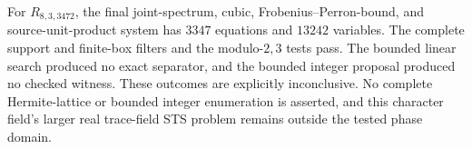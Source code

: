For $R_{8,3,3472}$, the final joint-spectrum, cubic, Frobenius--Perron-bound,
and source-unit-product system has $3347$ equations and $13242$ variables.
The complete support and finite-box filters and the modulo-$2,3$ tests
pass.  The bounded linear search produced no exact separator, and the
bounded integer proposal produced no checked witness.  These outcomes
are explicitly inconclusive.  No complete Hermite-lattice or bounded
integer enumeration is asserted, and this character field's larger
real trace-field STS problem remains outside the tested phase domain.
